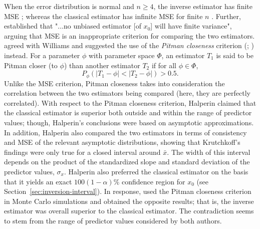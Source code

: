 \documentclass[cmfont,usenames,dvipsnames,leqno]{afit-etd}\usepackage[]{graphicx}\usepackage[]{color}
\begin{document}
When the error distribution is normal and $n \ge 4$, the inverse estimator has finite MSE \citep{oman_exact_1985}; whereas the classical estimator has infinite MSE for finite $n$ \citep{williams_note_1969}. Further, \citet{williams_note_1969} established that "...no unbiased estimator [of $x_0$] will have finite variance", arguing that MSE is an inappropriate criterion for comparing the two estimators. \citet{halperin_inverse_1970} agreed with Williams and suggested the use of the \textit{Pitman closeness} criterion (\citealt{pitman_closest_1937}; \citealt[pg. 290]{mood_introduction_1974}) instead. For a parameter $\phi$ with parameter space $\Phi$, an estimator $T_1$ is said to be Pitman closer (to $\phi$) than another estimator $T_2$ if for all $\phi \in \Phi$,
\begin{equation}
  P_\phi(|T_1 - \phi| < |T_2 - \phi|) > 0.5.
\end{equation}
Unlike the MSE criterion, Pitman closeness takes into consideration the correlation between the two estimators being compared (here, they are perfectly correlated). With respect to the Pitman closeness criterion, Halperin claimed that the classical estimator is superior both outside and within the range of predictor values; though, Halperin's conclusions were based on asymptotic approximations. In addition, Halperin also compared the two estimators in terms of consistency and MSE of the relevant asymptotic distributions, showing that Krutchkoff's findings were only true for a closed interval around $\bar{x}$. The width of this interval depends on the product of the standardized slope and standard deviation of the predictor values, $\sigma_x$. Halperin also preferred the classical estimator on the basis that it yields an exact $100(1 - \alpha)\%$ confidence region for $x_0$ (see Section~\ref{sec:inversion-interval}). In response, \citet{krutchkoff_calibration_1972} used the Pitman closeness criterion in Monte Carlo simulations and obtained the opposite results; that is, the inverse estimator was overall superior to the classical estimator. The contradiction seems to stem from the range of predictor values considered by both authors.
\end{document}
